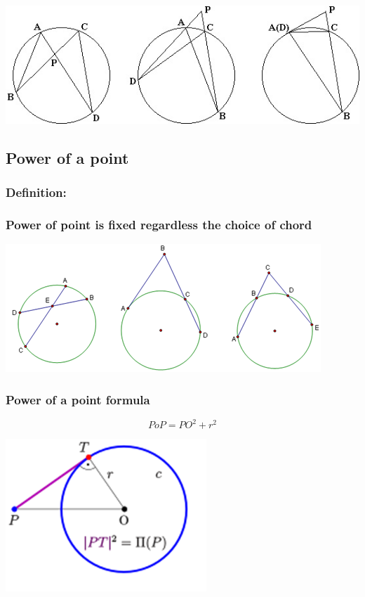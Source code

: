 \documentclass{article}
\begin{document}
\includegraphics[scale=.75]{Picture12.jpg}

\vspace{100px}

\subsection{Power of a point}

\subsubsection{Definition:}

\vspace{20px}

\subsubsection{Power of point is fixed regardless the choice of chord}

\includegraphics[scale=1.2]{Picture13.png}

\pagebreak

\subsubsection{Power of a point formula}

\[PoP = {PO}^2+r^2\]

\begin{center}
\includegraphics{Picture14.png}
\end{center}
\end{document}
